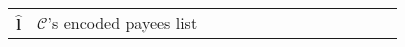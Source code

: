 \begin{table}[!htbp]
\begin{scriptsize}
\begin{center}
{{\begin{tabular}{|c|c|c|c|c|c|c|c|c|c|c|c|c|c|}
%


%

%
\cellcolor{gray!20}\scriptsize$\hat{\bm{l}}$ &\cellcolor{gray!20}\scriptsize  $\mathcal{C}$'s encoded payees list\\ 
%



\end{tabular}}}
\end{center}
\end{scriptsize}
\end{table}
